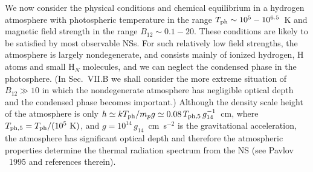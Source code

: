 We now consider the physical conditions and chemical equilibrium 
in a hydrogen atmosphere with photospheric temperature in the range
$T_{\rm ph}\sim 10^5-10^{6.5}$~K and magnetic field strength in the range 
$B_{12}\sim 0.1-20$. These conditions are likely to be satisfied by 
most observable NSs. For such relatively low field strengths, 
the atmosphere is largely nondegenerate, and consists mainly of 
ionized hydrogen, H atoms and small H$_N$ molecules, and we can neglect the
condensed phase in the photosphere. 
(In Sec.~VII.B we shall consider the more extreme situation of 
$B_{12}\gg 10$ in which the nondegenerate atmosphere has negligible
optical depth and the condensed phase becomes important.)
Although the density scale height of the
atmosphere is only $h\simeq k T_{\rm ph}/ m_p g \simeq 0.08\,T_{\rm
ph,5}\,g_{14}^{-1}$~cm, where $T_{\rm ph,5}=T_{\rm ph}/(10^5~{\rm K})$, and
$g=10^{14}\,g_{14}$~cm~s$^{-2}$ is the gravitational acceleration,
the atmosphere has significant optical depth and therefore the atmospheric
properties determine the thermal radiation spectrum from the NS
(see Pavlov \etal~1995 and references therein).


